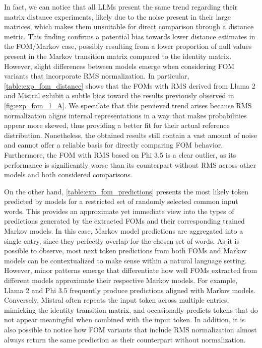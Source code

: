 In fact, we can notice that all LLMs present the same trend regarding their matrix distance experiments, likely due to the noise present in their large matrices, which makes them unsuitable for direct comparison through a distance metric.
This finding confirms a potential bias towards lower distance estimates in the FOM/Markov case, possibly resulting from a lower proportion of null values present in the Markov transition matrix compared to the identity matrix.
However, slight differences between models emerge when considering FOM variants that incorporate RMS normalization.
In particular, \cref{table:exp_fom_distance} shows that the FOMs with RMS derived from Llama 2 and Mistral exhibit a subtle bias toward the results previously observed in \cref{fig:exp_fom_1_A}.
We speculate that this percieved trend arises because RMS normalization aligns internal representations in a way that makes probabilities appear more skewed, thus providing a better fit for their actual reference distribution.
Nonetheless, the obtained results still contain a vast amount of noise and cannot offer a reliable basis for directly comparing FOM behavior.
Furthermore, the FOM with RMS based on Phi 3.5 is a clear outlier, as its performance is significantly worse than its counterpart without RMS across other models and both considered comparisons.

On the other hand, \cref{table:exp_fom_predictions} presents the most likely token predicted by models for a restricted set of randomly selected common input words.
This provides an approximate yet immediate view into the types of predictions generated by the extracted FOMs and their corresponding trained Markov models.
In this case, Markov model predictions are aggregated into a single entry, since they perfectly overlap for the chosen set of words.
As it is possible to observe, most next token predictions from both FOMs and Markov models can be contextualized to make sense within a natural language setting.
However, minor patterns emerge that differentiate how well FOMs extracted from different models approximate their respective Markov models.
For example, Llama 2 and Phi 3.5 frequently produce predictions aligned with Markov models.
Conversely, Mistral often repeats the input token across multiple entries, mimicking the identity transition matrix, and occasionally predicts tokens that do not appear meaningful when combined with the input token.
In addition, it is also possible to notice how FOM variants that include RMS normalization almost always return the same prediction as their counterpart without normalization.

